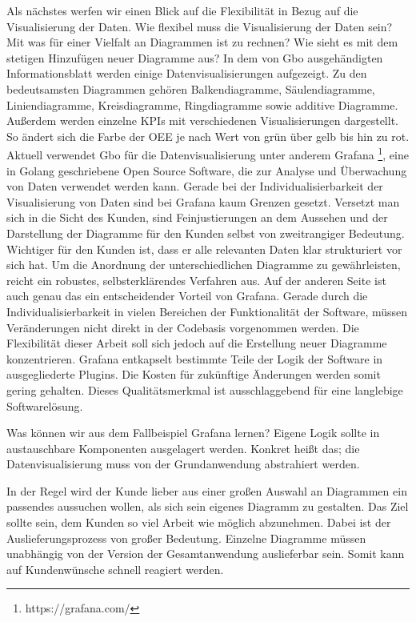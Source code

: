 Als nächstes werfen wir einen Blick auf die Flexibilität in Bezug auf die Visualisierung der Daten. Wie flexibel
muss die Visualisierung der Daten sein? Mit was für einer Vielfalt an Diagrammen ist zu rechnen? Wie sieht es
mit dem stetigen Hinzufügen neuer Diagramme aus? In dem von Gbo ausgehändigten Informationsblatt
werden einige Datenvisualisierungen aufgezeigt. Zu den bedeutsamsten Diagrammen gehören Balkendiagramme,
Säulendiagramme, Liniendiagramme, Kreisdiagramme, Ringdiagramme sowie additive Diagramme. Außerdem werden
einzelne KPIs mit verschiedenen Visualisierungen dargestellt. So ändert sich die Farbe der OEE je nach
Wert von grün über gelb bis hin zu rot. Aktuell verwendet Gbo für die Datenvisualisierung unter
anderem Grafana \footnote{https://grafana.com/}, eine in Golang geschriebene Open Source Software, die zur Analyse
und Überwachung von Daten verwendet werden kann. Gerade bei der Individualisierbarkeit der Visualisierung
von Daten sind bei Grafana kaum Grenzen gesetzt. Versetzt man sich in die Sicht des Kunden, sind \mbox{Feinjustierungen}
an dem Aussehen und der Darstellung der Diagramme für den Kunden selbst von zweitrangiger Bedeutung.
Wichtiger für den Kunden ist, dass er alle relevanten Daten klar strukturiert vor sich hat. Um die Anordnung
der unterschiedlichen Diagramme zu gewährleisten, reicht ein robustes, selbsterklärendes Verfahren aus.
Auf der anderen Seite ist auch genau das ein entscheidender Vorteil von Grafana. Gerade durch die
Individualisierbarkeit in vielen Bereichen der Funktionalität der Software, müssen Veränderungen nicht
direkt in der Codebasis vorgenommen werden. Die Flexibilität dieser Arbeit soll sich jedoch auf die
Erstellung neuer Diagramme konzentrieren. Grafana entkapselt bestimmte Teile der Logik der Software
in ausgegliederte Plugins.\cite{GrafanaDeveloperGuide} Die Kosten für zukünftige Änderungen werden
somit gering gehalten. Dieses Qualitätsmerkmal ist ausschlaggebend für eine langlebige Softwarelösung.

Was können wir aus dem Fallbeispiel Grafana lernen? Eigene Logik sollte in austauschbare Komponenten
ausgelagert werden. Konkret heißt das; die Datenvisualisierung muss von der Grundanwendung abstrahiert
werden.

In der Regel wird der Kunde lieber aus einer großen Auswahl an Diagrammen ein passendes aussuchen wollen,
als sich sein eigenes Diagramm zu gestalten. Das Ziel sollte sein, dem Kunden so viel Arbeit wie möglich abzunehmen.
Dabei ist der Auslieferungsprozess von großer Bedeutung. Einzelne Diagramme müssen unabhängig von der Version der
Gesamtanwendung auslieferbar sein. Somit kann auf Kundenwünsche schnell reagiert werden.

